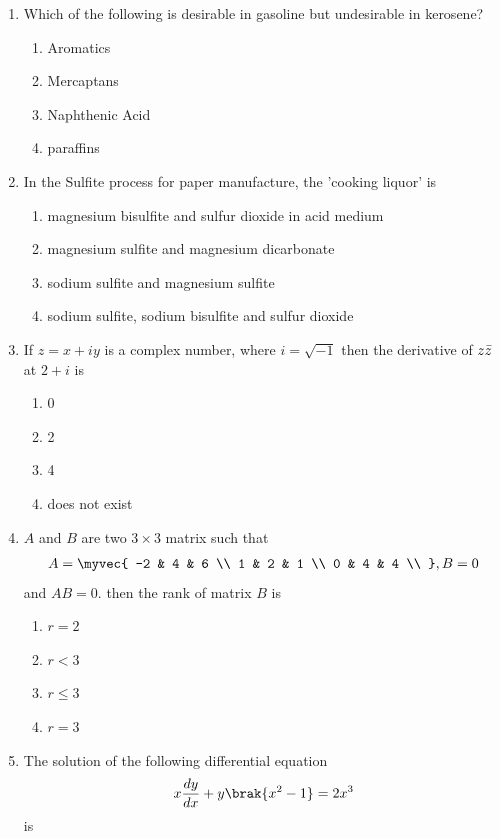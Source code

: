 \documentclass[journal,12pt,onecolumn]{IEEEtran}
\theoremstyle{remark}
\begin{document}
\begin{enumerate}
    \item Which of the following is desirable in gasoline but undesirable in kerosene?

\begin{enumerate}
    \item Aromatics
    \item Mercaptans
    \item Naphthenic Acid
    \item paraffins
\end{enumerate}

    \item In the Sulfite process for paper manufacture, the 'cooking liquor' is

\begin{enumerate}
    \item magnesium bisulfite and sulfur dioxide in acid medium
    \item magnesium sulfite and magnesium dicarbonate
    \item sodium sulfite and magnesium sulfite
    \item sodium sulfite, sodium bisulfite and sulfur dioxide
\end{enumerate}

    \item If $z=x+iy$ is a complex number, where $i=\sqrt{-1}$ then the derivative of $z\Bar{z}$ at $2+i$ is
\begin{multicols}{4}
\begin{enumerate}
    \item 0
    \item 2
    \item 4
    \item does not exist
\end{enumerate}
\end{multicols}
    \item $A$ and $B$ are two $3\times3$ matrix such  that 
    \begin{align*}
      A=  \myvec{
        -2 & 4 & 6 \\
        1 & 2 & 1 \\
        0 & 4 & 4 \\
        }, B = 0
    \end{align*}
and $AB=0$. then the rank of matrix $B$ is

\begin{multicols}{4}
    \begin{enumerate}
        \item $r=2$
        \item $r<3$
        \item $r \leq 3$
        \item $r=3$
    \end{enumerate}
\end{multicols}
\newpage
    \item The solution of the following differential equation 
    \begin{align*}
        x\frac{dy}{dx} + y\brak{x^2-1}= 2x^3
    \end{align*}
    is


\end{enumerate}
\end{document}
